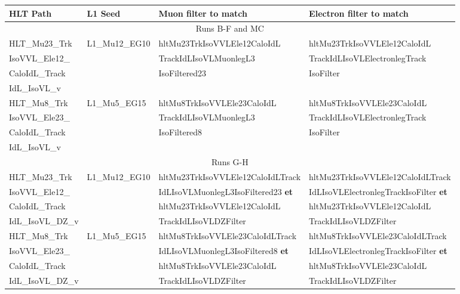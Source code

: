 {\footnotesize
\begin{tabularx}{\textwidth}{llXX}
\toprule
HLT Path & L1 Seed & Muon filter to match & Electron filter to match \\
\midrule
\multicolumn{4}{c}{Runs B-F and MC}
\\\hline
HLT\_Mu23\_Trk
&
L1\_Mu12\_EG10
&
hltMu23TrkIsoVVLEle12CaloIdL
&
hltMu23TrkIsoVVLEle12CaloIdL
\\
IsoVVL\_Ele12\_
&
&
TrackIdLIsoVLMuonlegL3
&
TrackIdLIsoVLElectronlegTrack
\\
CaloIdL\_Track
&
&
IsoFiltered23
&
IsoFilter
\\
IdL\_IsoVL\_v
\\\hline
HLT\_Mu8\_Trk
&
L1\_Mu5\_EG15
&
hltMu8TrkIsoVVLEle23CaloIdL
&
hltMu8TrkIsoVVLEle23CaloIdL
\\
IsoVVL\_Ele23\_
&
&
TrackIdLIsoVLMuonlegL3
&
TrackIdLIsoVLElectronlegTrack
\\
CaloIdL\_Track
&
&
IsoFiltered8
&
IsoFilter
\\
IdL\_IsoVL\_v
\\
\midrule
\multicolumn{4}{c}{Runs G-H}
\\\hline
HLT\_Mu23\_Trk
&
L1\_Mu12\_EG10
&
hltMu23TrkIsoVVLEle12CaloIdLTrack
&
hltMu23TrkIsoVVLEle12CaloIdLTrack
\\
IsoVVL\_Ele12\_
&
&
IdLIsoVLMuonlegL3IsoFiltered23 \textbf{et}
&
IdLIsoVLElectronlegTrackIsoFilter \textbf{et}
\\
CaloIdL\_Track
&
&
hltMu23TrkIsoVVLEle12CaloIdL
&
hltMu23TrkIsoVVLEle12CaloIdL
\\
IdL\_IsoVL\_DZ\_v
&
&
TrackIdLIsoVLDZFilter
&
TrackIdLIsoVLDZFilter
\\\hline
HLT\_Mu8\_Trk
&
L1\_Mu5\_EG15
&
hltMu8TrkIsoVVLEle23CaloIdLTrack
&
hltMu8TrkIsoVVLEle23CaloIdLTrack
\\
IsoVVL\_Ele23\_
&
&
IdLIsoVLMuonlegL3IsoFiltered8 \textbf{et}
&
IdLIsoVLElectronlegTrackIsoFilter \textbf{et}
\\
CaloIdL\_Track
&
&
hltMu8TrkIsoVVLEle23CaloIdL
&
hltMu8TrkIsoVVLEle23CaloIdL
\\
IdL\_IsoVL\_DZ\_v
&
&
TrackIdLIsoVLDZFilter
&
TrackIdLIsoVLDZFilter
\\
\bottomrule
\end{tabularx}
}